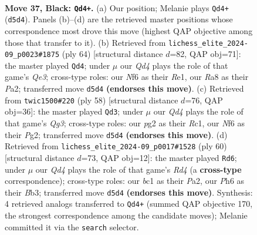 \documentclass[11pt]{article}
\begin{document}
\begin{figure}[p]
\label{fig:thought-m71}
\end{figure}

\clearpage

\begin{figure}[p]\centering
\begin{subfigure}{0.46\textwidth}\centering
\resizebox{\linewidth}{!}{%
\newchessgame
\chessboard[
  setfen={r1b4k/ppp2pp1/5n1p/3q4/8/Q4PbP/PPB3P1/R1B3K1 b - - 15 37},
  showmover=false,
  pgfstyle=straightmove, color=movearrow, markmove={d5-d4}
]}
\caption{}
\end{subfigure}\hfill
\begin{subfigure}{0.46\textwidth}\centering
\resizebox{\linewidth}{!}{%
\newchessgame
\chessboard[
  setfen={3r2k1/p3qpp1/1p6/3pPbp1/1P6/4Q2P/P4PP1/4RBK1 w - - 3 33},
  showmover=false,
  pgfstyle=straightmove, color=movearrow, markmove={e3-d4}
]}
\caption{}
\end{subfigure}
\\[4pt]
\begin{subfigure}{0.46\textwidth}\centering
\resizebox{\linewidth}{!}{%
\newchessgame
\chessboard[
  setfen={8/1b3rpk/1q5p/pP1pBp2/1b1P3P/1B4Q1/5PP1/2R3K1 w - - 1 30},
  showmover=false,
  pgfstyle=straightmove, color=movearrow, markmove={g3-d3}
]}
\caption{}
\end{subfigure}\hfill
\begin{subfigure}{0.46\textwidth}\centering
\resizebox{\linewidth}{!}{%
\newchessgame
\chessboard[
  setfen={8/pp2rp1k/2b2q2/5P1p/3RpQp1/1BP5/PP4PP/6K1 w - - 0 31},
  showmover=false,
  pgfstyle=straightmove, color=movearrow, markmove={d4-d6}
]}
\caption{}
\end{subfigure}
\caption{\textbf{Move 37, Black: \texttt{Qd4+}.} (a) Our position; Melanie plays \texttt{Qd4+} (\texttt{d5d4}). Panels (b)--(d) are the retrieved master positions whose correspondence most drove this move (highest QAP objective among those that transfer to it). (b) Retrieved from \texttt{lichess\_elite\_2024-09\_p0023\#1875} (ply 64) [structural distance $d$=82, QAP obj=71]: the master played \texttt{Qd4}; under $\mu$ our \emph{Qd4} plays the role of that game's \emph{Qe3}; cross-type roles: our \emph{N}f6 as their \emph{R}e1, our \emph{R}a8 as their \emph{P}a2; transferred move \texttt{d5d4} \textbf{(endorses this move)}. (c) Retrieved from \texttt{twic1500\#220} (ply 58) [structural distance $d$=76, QAP obj=36]: the master played \texttt{Qd3}; under $\mu$ our \emph{Qd4} plays the role of that game's \emph{Qg3}; cross-type roles: our \emph{p}g2 as their \emph{R}c1, our \emph{N}f6 as their \emph{P}g2; transferred move \texttt{d5d4} \textbf{(endorses this move)}. (d) Retrieved from \texttt{lichess\_elite\_2024-09\_p0017\#1528} (ply 60) [structural distance $d$=73, QAP obj=12]: the master played \texttt{Rd6}; under $\mu$ our \emph{Qd4} plays the role of that game's \emph{Rd4} (a \textbf{cross-type} correspondence); cross-type roles: our \emph{b}c1 as their \emph{P}a2, our \emph{P}h6 as their \emph{B}b3; transferred move \texttt{d5d4} \textbf{(endorses this move)}. Synthesis: 4 retrieved analogs transferred to \texttt{Qd4+} (summed QAP objective 170, the strongest correspondence among the candidate moves); Melanie committed it via the \texttt{search} selector.}

\end{figure}
\end{document}
